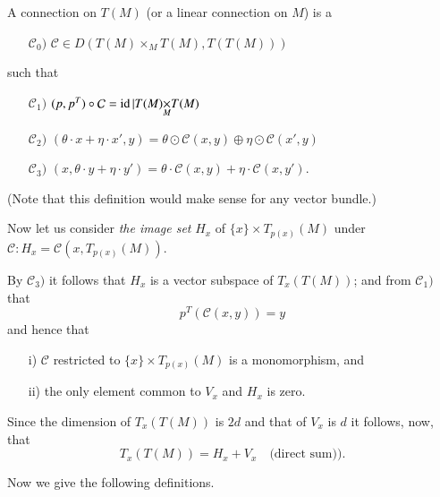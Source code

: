 \begin{defi*}
A \pageoriginale connection on $T(M)$ (or a linear connection on $M$) is a
\begin{itemize}
\item[$\mathcal{C}_{0})$] $\mathcal{C}\in
  D(T(M){\displaystyle{\mathop{\times}_{M}}}T(M), T(T(M)))$
\end{itemize}
such that
\begin{itemize}
\item[$\mathcal{C}_{1})$]
  $(p,p^{T})\circ\mathcal{C}=\operatorname{id}|T(M){\displaystyle{\mathop{\times}_{M}}}T(M)$

\item[$\mathcal{C}_{2})$] $(\theta\cdot x+\eta\cdot x',y)=\theta\odot
  \mathcal{C}(x,y)\oplus \eta\odot \mathcal{C}(x',y)$

\item[$\mathcal{C}_{3})$] $(x,\theta\cdot y+\eta\cdot y')=\theta\cdot
  \mathcal{C}(x,y)+\eta\cdot \mathcal{C}(x,y')$.
\end{itemize}
\end{defi*}

(Note that this definition would make sense for any vector bundle.)

Now let us consider {\em the image set} $H_{x}$ of $\{x\}\times
T_{p(x)}(M)$ under $\mathcal{C}:H_{x}=\mathcal{C}(x,T_{p(x)}(M))$.

By $\mathcal{C}_{3})$ it follows that $H_{x}$ is a vector subspace of
$T_{x}(T(M))$; and from $\mathcal{C}_{1})$ that
$$
p^{T}(\mathcal{C}(x,y))=y
$$
and hence that
\begin{itemize}
\item[i)] $\mathcal{C}$ restricted to $\{x\}\times T_{p(x)}(M)$ is a
  monomorphism, and

\item[ii)] the only element common to $V_{x}$ and $H_{x}$ is zero.
\end{itemize}
Since the dimension of $T_{x}(T(M))$ is $2d$ and that of $V_{x}$ is
$d$ it follows, now, that
\begin{equation*}
T_{x}(T(M))=H_{x}+V_{x}\quad\text{(direct sum))}.\tag{2.1.6}\label{chap2:2.1.6}
\end{equation*}

Now we give the following definitions.

\setcounter{subsection}{6}

\subsection{}\label{chap2:2.1.7}

